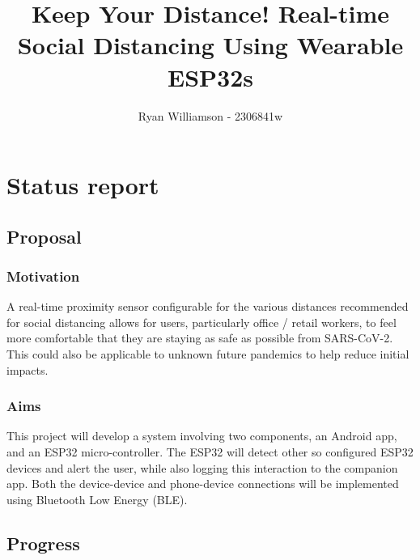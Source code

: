 \documentclass[11pt]{article}
\title{Keep Your Distance! Real-time Social Distancing Using Wearable ESP32s}
\author{Ryan Williamson - 2306841w}
\begin{document}
    \maketitle
    
    
     

\section{Status report}

\subsection{Proposal}\label{proposal}

\subsubsection{Motivation}\label{motivation}

A real-time proximity sensor configurable for the various distances recommended 
for social distancing allows for users, particularly office / retail 
workers, to feel more comfortable that they are staying as safe as 
possible from SARS-CoV-2. This could also be applicable to unknown 
future pandemics to help reduce initial impacts.

\subsubsection{Aims}\label{aims}

This project will develop a system involving two components, an 
Android app, and an ESP32 micro-controller. The ESP32 will detect 
other so configured ESP32 devices and alert the user, while also 
logging this interaction to the companion app. Both the device-device 
and phone-device connections will be implemented using Bluetooth Low 
Energy (BLE).

\subsection{Progress}\label{progress}
\end{document}
